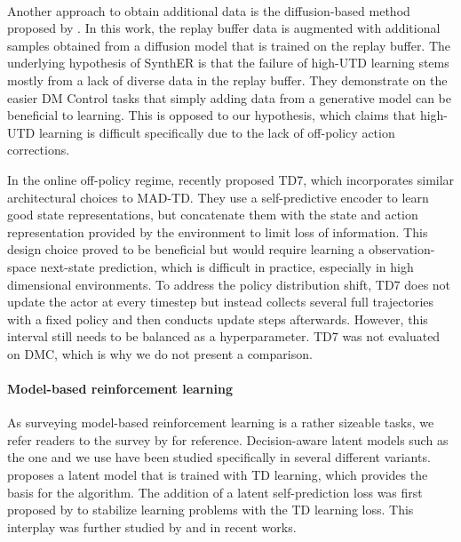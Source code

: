 \paragraph{} Another  approach to obtain additional data is the diffusion-based method proposed by \textcite{lu2024synthetic}.
In this work, the replay buffer data is augmented with additional samples obtained from a diffusion model that is trained on the replay buffer.
The underlying hypothesis of SynthER is that the failure of high-UTD learning stems mostly from a lack of diverse data in the replay buffer. 
They demonstrate on the easier DM Control tasks that simply adding data from a generative model can be beneficial to learning. 
This is opposed to our hypothesis, which claims that high-UTD learning is difficult specifically due to the lack of off-policy action corrections.

In the online off-policy regime, \textcite{fujimoto2024sale} recently proposed TD7, which incorporates similar architectural choices to MAD-TD.
They use a self-predictive encoder to learn good state representations, but concatenate them with the state and action representation provided by the environment to limit loss of information.
This design choice proved to be beneficial but would require learning a observation-space next-state prediction, which is difficult in practice, especially in high dimensional environments.
To address the policy distribution shift, TD7 does not update the actor at every timestep but instead collects several full trajectories with a fixed policy and then conducts update steps afterwards.
However, this interval still needs to be balanced as a hyperparameter.
TD7 was not evaluated on DMC, which is why we do not present a comparison.


\paragraph{Model-based reinforcement learning} As surveying model-based reinforcement learning is a rather sizeable tasks, we refer readers to the survey by \textcite{moerland} for reference.
Decision-aware latent models such as the one \textcite{hansen2024tdmpc} and we use have been studied specifically in several different variants.
\textcite{silver2017predictron} proposes a latent model that is trained with TD learning, which provides the basis for the \textcite{schrittwieser2020mastering} algorithm.
The addition of a latent self-prediction loss was first proposed by \textcite{li2023efficient} to stabilize learning problems with the TD learning loss.
This interplay was further studied by \textcite{ni2024bridging} and \textcite{voelcker2024when} in recent works.


